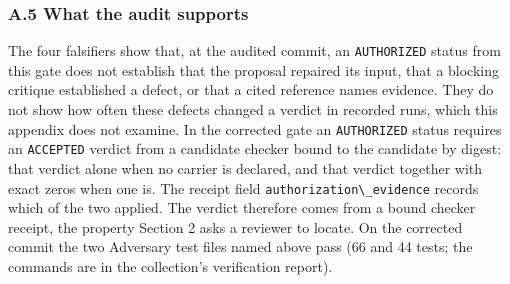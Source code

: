 \documentclass[
  11pt,
]{article}
\newcommand{\passthrough}[1]{#1}
\begin{document}
\subsubsection{A.5 What the audit
supports}\label{a.5-what-the-audit-supports}

The four falsifiers show that, at the audited commit, an
\passthrough{\lstinline!AUTHORIZED!} status from this gate does not
establish that the proposal repaired its input, that a blocking critique
established a defect, or that a cited reference names evidence. They do
not show how often these defects changed a verdict in recorded runs,
which this appendix does not examine. In the corrected gate an
\passthrough{\lstinline!AUTHORIZED!} status requires an
\passthrough{\lstinline!ACCEPTED!} verdict from a candidate checker
bound to the candidate by digest: that verdict alone when no carrier is
declared, and that verdict together with exact zeros when one is. The
receipt field \passthrough{\lstinline!authorization\_evidence!} records
which of the two applied. The verdict therefore comes from a bound
checker receipt, the property Section 2 asks a reviewer to locate. On
the corrected commit the two Adversary test files named above pass (66 and
44 tests; the commands are in the collection's verification report).
\end{document}
